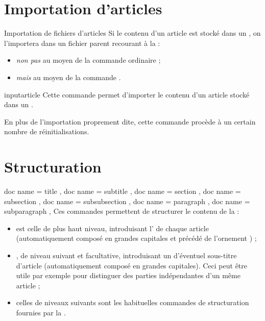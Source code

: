 \documentclass{letgut}
\begin{document}
\section{Importation d'articles}
\label{sec:import-dart}

\begin{dbwarning}{Importation de fichiers d'articles}{}
  Si le contenu d'un article est stocké dans un ,
  on l'importera dans un fichier parent recourant à la  :
  \begin{itemize}
  \item \emph{non pas} au moyen de la commande ordinaire  ;
  \item \emph{mais}  au moyen de la commande .
  \end{itemize}
\end{dbwarning}

\begin{docCommand}{inputarticle}{}
  Cette commande permet d'importer le contenu d'un article stocké dans un
  .

  En plus de l'importation proprement dite, cette commande procède à un certain
  nombre de réinitialisations.
\end{docCommand}

\section{Structuration}
\label{sec:structuration}

\begin{docCommands}[
  doc parameter = \oarg{intitulé alternatif}\marg{intitulé}
  ]
  {
    { doc name = title },
    { doc name = subtitle },
    { doc name = section },
    { doc name = subsection },
    { doc name = subsubsection },
    { doc name = paragraph },
    { doc name = subparagraph },
  }
  Ces commandes permettent de structurer le contenu de la  :
  \begin{itemize}
  \item {} est celle de plus haut niveau, introduisant
    l' de chaque article (automatiquement composé en grandes
    capitales et précédé de l'ornement \aldineleft) ;
  \item {}, de niveau suivant et facultative, introduisant un
     d'éventuel sous-titre d'article (automatiquement composé en
    grandes capitales). Ceci peut être utile par exemple pour distinguer des
    parties indépendantes d'un même article ;
  \item celles de niveaux suivants sont les habituelles commandes de
    structuration fournies par la .
  \end{itemize}
\end{docCommands}
\end{document}
